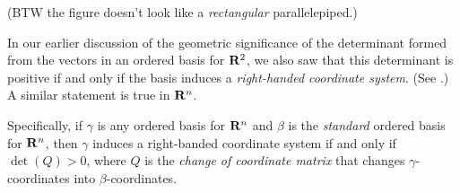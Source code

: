 (BTW the figure doesn't look like a \emph{rectangular} parallelepiped.)

\begin{remark} \label{remark 4.3.4}
In our earlier discussion of the geometric significance of the determinant formed from the vectors in an ordered basis for \(\mathbf{R}^2\), we also saw that this determinant is positive if and only if the basis induces a \emph{right-handed coordinate system}.
(See .)
A similar statement is true in \(\mathbf{R}^n\).
\end{remark}

\begin{additional definition}
Specifically, if \(\gamma\) is any ordered basis for \(\mathbf{R}^{n}\)
and \(\beta\) is the \emph{standard} ordered basis for \(\mathbf{R}^n\), then \(\gamma\) induces a right-banded coordinate system if and only if \(\det(Q) > 0\), where \(Q\) is the \emph{change of coordinate matrix} that changes \(\gamma\)-coordinates into \(\beta\)-coordinates.
\end{additional definition}

